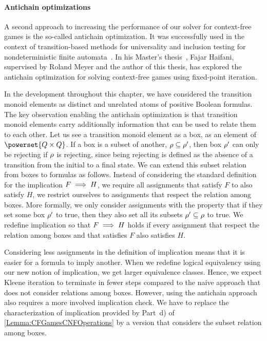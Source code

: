 \documentclass[../../diss.tex]{subfiles}
\begin{document}
\paragraph{Antichain optimizations}

A second approach to increasing the performance of our solver for context-free games is the so-called antichain optimization.
It was successfully used in the context of transition-based methods for universality and inclusion testing for nondeterministic finite automata~\cite{DeWulfDHR06,AbdullaCHMV10}.
In his Master's thesis~\cite{Haifani17}, Fajar Haifani, supervised by Roland Meyer and the author of this thesis, has explored the antichain optimization for solving context-free games using fixed-point iteration.

In the development throughout this chapter, we have considered the transition monoid elements as distinct and unrelated atoms of positive Boolean formulas.
The key observation enabling the antichain optimization is that transition monoid elements carry additionally information that can be used to relate them to each other.
Let us see a transition monoid element as a box, \ie as an element of $\powerset{Q \times Q}$.
If a box is a subset of another, $\tbox \subseteq \tbox'$, then box $\tbox'$ can only be rejecting if $\tbox$ is rejecting, since being rejecting is defined as the absence of a transition from the initial to a final state.
We can extend this subset relation from boxes to formulas as follows.
Instead of considering the standard definition for the implication $F \implies H$, \ie we require all assignments that satisfy $F$ to also satisfy $H$, we restrict ourselves to assignments that respect the relation among boxes.
More formally, we only consider assignments with the property that if they set some box $\tbox'$ to true, then they also set all its subsets $\tbox' \subseteq \tbox$ to true.
We redefine implication so that $F \implies H$ holds if every assignment that respect the relation among boxes and that satisfies $F$ also satisfies $H$.

Considering less assignments in the definition of implication means that it is easier for a formula to imply another.
When we redefine logical equivalency using our new notion of implication, we get larger equivalence classes.
Hence, we expect Kleene iteration to terminate in fewer steps compared to the naive approach that does not consider relations among boxes.
However, using the antichain approach also requires a more involved implication check.
We have to replace the characterization of implication provided by Part~d) of \cref{Lemma:CFGamesCNFOperations} by a version that considers the subset relation among boxes.
\end{document}
